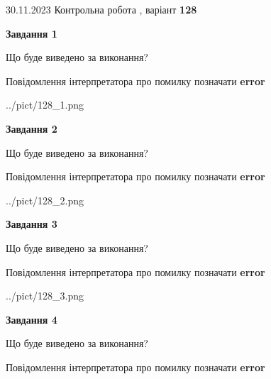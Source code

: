 \documentclass[12pt, ukrainian]{article}
\begin{document}
{{30.11.2023 Контрольна робота , варіант  \No \textbf { 128 }\par}}
{




{\begin {center}\textbf{Завдання 1}\end {center}}\par
Що буде виведено за виконання? \par
Повідомлення інтерпретатора про помилку позначати \textbf{error}

\begin{center}
	{../pict/128_1.png}
\end{center}
\newpage

{\begin {center}\textbf{Завдання 2}\end {center}}\par
Що буде виведено за виконання? \par
Повідомлення інтерпретатора про помилку позначати \textbf{error}

\begin{center}
	{../pict/128_2.png}
\end{center}
\newpage

{\begin {center}\textbf{Завдання 3}\end {center}}\par
Що буде виведено за виконання? \par
Повідомлення інтерпретатора про помилку позначати \textbf{error}

\begin{center}
	{../pict/128_3.png}
\end{center}
\newpage

{\begin {center}\textbf{Завдання 4}\end {center}}\par
Що буде виведено за виконання? \par
Повідомлення інтерпретатора про помилку позначати \textbf{error}

}
\end{document}
